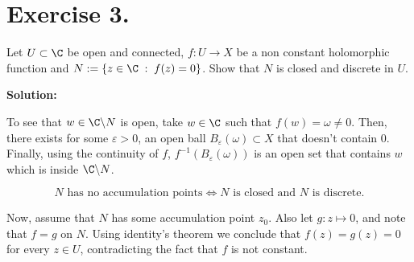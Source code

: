 \section*{Exercise 3.}

Let $U \subset \C$ be open and connected, $f: U \to X$ be a non constant holomorphic function and $N := \{z \in \C \;:\; f(z) = 0\}$. Show that $N$ is closed and discrete in $U$.

\textbf{Solution:}

To see that $w \in \C\backslash N$ is open, take $w \in \C$ such that $f(w) = \omega \neq 0$. Then, there exists for some $\varepsilon > 0$, an open ball $B_\varepsilon(\omega) \subset X$ that doesn't contain $0$. Finally, using the continuity of $f$, $f^{-1}(B_\varepsilon(\omega))$ is an open set that contains $w$ which is inside $\C \backslash N$.

\[ N \mbox{ has no accumulation points} \iff N\mbox{ is closed and }N \mbox{ is discrete.} \]

Now, assume that $N$ has some accumulation point $z_0$. Also let $g: z \mapsto 0$, and note that $f = g$ on $N$. Using identity's theorem we conclude that $f(z) = g(z) = 0$ for every $z\in U$, contradicting the fact that $f$ is not constant.
